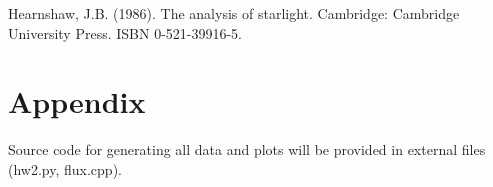 \documentclass[onecolumn]{aastex6}
\newcommand\aastex{AAS\TeX}
\begin{document}



\vspace{5mm}

\begin{thebibliography}{}


Hearnshaw, J.B. (1986). The analysis of starlight. Cambridge: Cambridge University Press. ISBN 0-521-39916-5.


\end{thebibliography}


\section{Appendix}

Source code for generating all data and plots will be provided in external files\,(hw2.py, flux.cpp).











\end{document}
